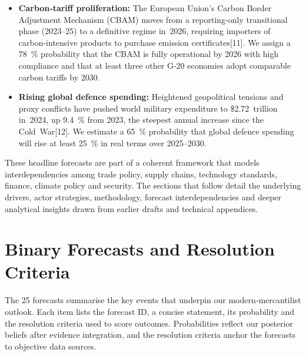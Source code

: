 \documentclass{article}
\begin{document}
\begin{itemize}
\item \textbf{Carbon‑tariff proliferation:}  The European Union’s Carbon Border Adjustment Mechanism (CBAM) moves from a reporting‑only transitional phase (2023–25) to a definitive regime in 2026, requiring importers of carbon‑intensive products to purchase emission certificates[11].  We assign a 78 \% probability that the CBAM is fully operational by 2026 with high compliance and that at least three other G‑20 economies adopt comparable carbon tariffs by 2030.

\item \textbf{Rising global defence spending:}  Heightened geopolitical tensions and proxy conflicts have pushed world military expenditure to \$2.72 trillion in 2024, up 9.4 \% from 2023, the steepest annual increase since the Cold War[12].  We estimate a 65 \% probability that global defence spending will rise at least 25 \% in real terms over 2025–2030.
\end{itemize}

These headline forecasts are part of a coherent framework that models interdependencies among trade policy, supply chains, technology standards, finance, climate policy and security.  The sections that follow detail the underlying drivers, actor strategies, methodology, forecast interdependencies and deeper analytical insights drawn from earlier drafts and technical appendices.

\clearpage

\section{Binary Forecasts and Resolution Criteria}

The 25 forecasts summarise the key events that underpin our modern‑mercantilist outlook.  Each item lists the forecast ID, a concise statement, its probability and the resolution criteria used to score outcomes.  Probabilities reflect our posterior beliefs after evidence integration, and the resolution criteria anchor the forecasts to objective data sources.
\end{document}
